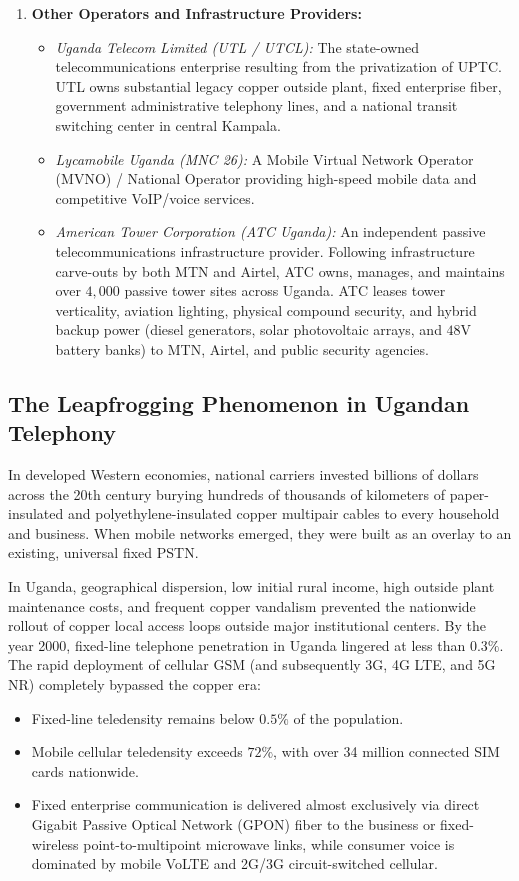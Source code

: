 \documentclass[12pt,a4paper]{report}
\begin{document}
\begin{enumerate}
    \item \textbf{Other Operators and Infrastructure Providers:}
    \begin{itemize}
        \item \textit{Uganda Telecom Limited (UTL / UTCL):} The state-owned telecommunications enterprise resulting from the privatization of UPTC. UTL owns substantial legacy copper outside plant, fixed enterprise fiber, government administrative telephony lines, and a national transit switching center in central Kampala.
        \item \textit{Lycamobile Uganda (MNC 26):} A Mobile Virtual Network Operator (MVNO) / National Operator providing high-speed mobile data and competitive VoIP/voice services.
        \item \textit{American Tower Corporation (ATC Uganda):} An independent passive telecommunications infrastructure provider. Following infrastructure carve-outs by both MTN and Airtel, ATC owns, manages, and maintains over $4,000$ passive tower sites across Uganda. ATC leases tower verticality, aviation lighting, physical compound security, and hybrid backup power (diesel generators, solar photovoltaic arrays, and $48\text{V}$ battery banks) to MTN, Airtel, and public security agencies.
    \end{itemize}
\end{enumerate}

\subsection{The Leapfrogging Phenomenon in Ugandan Telephony}
In developed Western economies, national carriers invested billions of dollars across the 20th century burying hundreds of thousands of kilometers of paper-insulated and polyethylene-insulated copper multipair cables to every household and business. When mobile networks emerged, they were built as an overlay to an existing, universal fixed PSTN.

In Uganda, geographical dispersion, low initial rural income, high outside plant maintenance costs, and frequent copper vandalism prevented the nationwide rollout of copper local access loops outside major institutional centers. By the year 2000, fixed-line telephone penetration in Uganda lingered at less than $0.3\%$. The rapid deployment of cellular GSM (and subsequently 3G, 4G LTE, and 5G NR) completely bypassed the copper era:
\begin{itemize}
    \item Fixed-line teledensity remains below $0.5\%$ of the population.
    \item Mobile cellular teledensity exceeds $72\%$, with over 34 million connected SIM cards nationwide.
    \item Fixed enterprise communication is delivered almost exclusively via direct Gigabit Passive Optical Network (GPON) fiber to the business or fixed-wireless point-to-multipoint microwave links, while consumer voice is dominated by mobile VoLTE and 2G/3G circuit-switched cellular.
\end{itemize}
\end{document}
